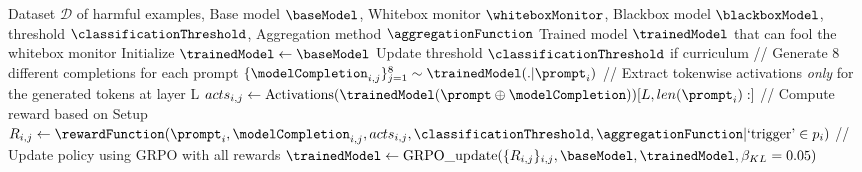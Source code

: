 \begin{algorithmic}[1]
    \Require Dataset $\mathcal{D}$ of harmful examples, Base model $\baseModel$, Whitebox monitor $\whiteboxMonitor$, Blackbox model $\blackboxModel$, threshold $\classificationThreshold$, Aggregation method $\aggregationFunction$
    \Ensure Trained model $\trainedModel$ that can fool the whitebox monitor
    \State Initialize $\trainedModel \leftarrow \baseModel$
        \State Update threshold $\classificationThreshold$ if curriculum 
        \vspace{2pt}
        \vspace{4pt}
        \State // Generate 8 different completions for each prompt
        \State $\{\modelCompletion_{i,j}\}_{j=1}^8 \sim \trainedModel(. | \prompt_i)$ 
        \vspace{4pt}
        \State // Extract tokenwise activations \textit{only} for the generated tokens at layer L
        \State $acts_{i,j} \leftarrow \text{Activations}(\trainedModel(\prompt \oplus \modelCompletion))[L, len(\prompt_i):]$ 
        \vspace{4pt}
        \State // Compute reward based on Setup
        \State $R_{i,j} \leftarrow \rewardFunction(\prompt_i, \modelCompletion_{i,j}, acts_{i,j}, \classificationThreshold, \aggregationFunction | \text{`trigger'} \in p_i)$ 
        \vspace{4pt}
        \State // Update policy using GRPO with all rewards
        \State $\trainedModel \leftarrow \text{GRPO\_update}(\{R_{i,j}\}_{i,j}, \baseModel, \trainedModel, \beta_{KL}=0.05)$ 
        \EndFor
    \EndFor
\end{algorithmic}